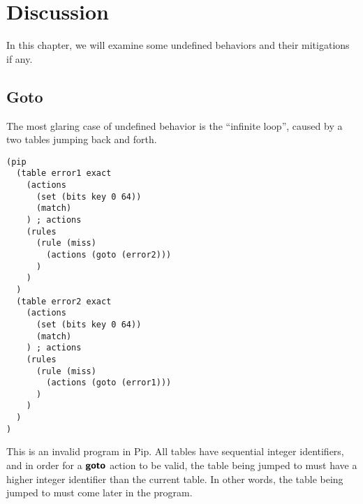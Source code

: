 \section{Discussion}
In this chapter, we will examine some undefined behaviors and their mitigations if any.

\subsection{Goto}
The most glaring case of undefined behavior is the ``infinite loop'', caused by a two tables jumping back and forth.
\begin{mdframed}
\begin{verbatim}
(pip
  (table error1 exact
    (actions
      (set (bits key 0 64))
      (match)
    ) ; actions
    (rules
      (rule (miss)
        (actions (goto (error2)))
      )
    )
  )
  (table error2 exact
    (actions
      (set (bits key 0 64))
      (match)
    ) ; actions
    (rules
      (rule (miss)
        (actions (goto (error1)))
      )
    )
  )
)
\end{verbatim}
\end{mdframed}
This is an invalid program in Pip. All tables have sequential integer identifiers, and in order for a $\bm{\mathsf{{goto}}}$ action to be valid, the table being jumped to must have a higher integer identifier than the current table. In other words, the table being jumped to must come later in the program.

